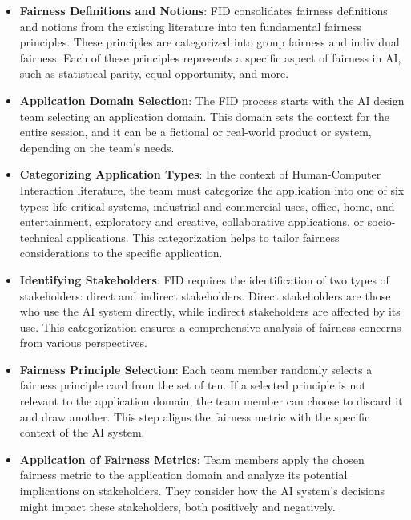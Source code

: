 \documentclass{article}
\begin{document}
\begin{itemize}

    \item \textbf{Fairness Definitions and Notions}: FID consolidates fairness definitions and notions from the existing literature into ten fundamental fairness principles. These principles are categorized into group fairness and individual fairness. Each of these principles represents a specific aspect of fairness in AI, such as statistical parity, equal opportunity, and more.
    
    \item \textbf{Application Domain Selection}: The FID process starts with the AI design team selecting an application domain. This domain sets the context for the entire session, and it can be a fictional or real-world product or system, depending on the team's needs.
    
    \item \textbf{Categorizing Application Types}: In the context of Human-Computer Interaction literature, the team must categorize the application into one of six types: life-critical systems, industrial and commercial uses, office, home, and entertainment, exploratory and creative, collaborative applications, or socio-technical applications. This categorization helps to tailor fairness considerations to the specific application.
    
    \item \textbf{Identifying Stakeholders}: FID requires the identification of two types of stakeholders: direct and indirect stakeholders. Direct stakeholders are those who use the AI system directly, while indirect stakeholders are affected by its use. This categorization ensures a comprehensive analysis of fairness concerns from various perspectives.
    
    \item \textbf{Fairness Principle Selection}: Each team member randomly selects a fairness principle card from the set of ten. If a selected principle is not relevant to the application domain, the team member can choose to discard it and draw another. This step aligns the fairness metric with the specific context of the AI system.
    
    \item \textbf{Application of Fairness Metrics}: Team members apply the chosen fairness metric to the application domain and analyze its potential implications on stakeholders. They consider how the AI system's decisions might impact these stakeholders, both positively and negatively.
    

\end{itemize}
\end{document}
